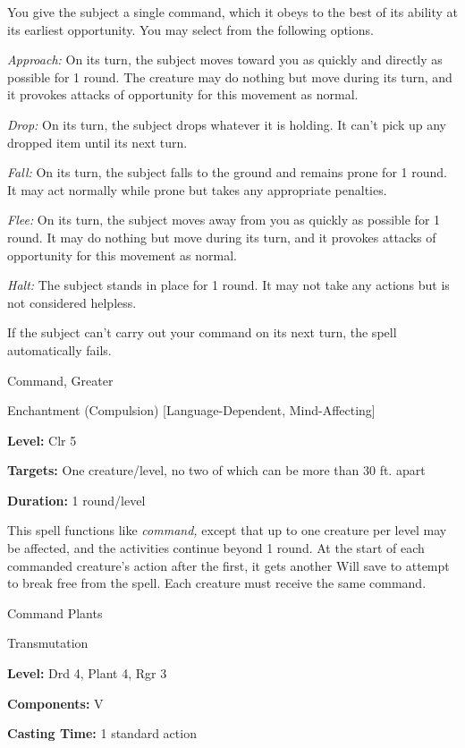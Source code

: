 \documentclass{article}
\begin{document}
You give the subject a single command, which it obeys to the best of its ability 
at its earliest opportunity. You may select from the following options.

\textit{Approach: }On its turn, the subject moves toward you as quickly and directly 
as possible for 1 round. The creature may do nothing but move during its turn, 
and it provokes attacks of opportunity for this movement as normal.

\textit{Drop: }On its turn, the subject drops whatever it is holding. It can't 
pick up any dropped item until its next turn.

\textit{Fall: }On its turn, the subject falls to the ground and remains prone for 
1 round. It may act normally while prone but takes any appropriate penalties.

\textit{Flee: }On its turn, the subject moves away from you as quickly as possible 
for 1 round. It may do nothing but move during its turn, and it provokes attacks 
of opportunity for this movement as normal.

\textit{Halt: }The subject stands in place for 1 round. It may not take any actions 
but is not considered helpless.

If the subject can't carry out your command on its next turn, the spell automatically 
fails.

\vspace{12pt}
Command, Greater

Enchantment (Compulsion) [Language-Dependent, Mind-Affecting]

\textbf{Level:} Clr 5

\textbf{Targets:} One creature/level, no two of which can be more than 30 ft. apart

\textbf{Duration:} 1 round/level

This spell functions like \textit{command, }except that up to one creature per 
level may be affected, and the activities continue beyond 1 round. At the start 
of each commanded creature's action after the first, it gets another Will save 
to attempt to break free from the spell. Each creature must receive the same command.

\vspace{12pt}
Command Plants

Transmutation

\textbf{Level:} Drd 4, Plant 4, Rgr 3

\textbf{Components:} V

\textbf{Casting Time:} 1 standard action
\end{document}
